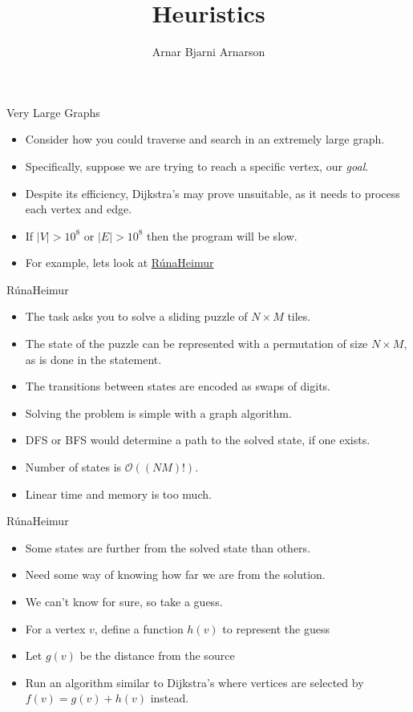 \documentclass{beamer}
\title{Heuristics}
\author{Arnar Bjarni Arnarson}
\institute{\href{http://ru.is/td}{School of Computer Science} \\[2pt] \href{http://ru.is}{ReykjavÃ­k University}}
\begin{document}
\maketitle

\begin{frame}[plain]{Very Large Graphs}
    \vspace{5pt}
    \begin{itemize}
        \item Consider how you could traverse and search in an extremely large graph.
        \item Specifically, suppose we are trying to reach a specific vertex, our \emph{goal}.
        \item Despite its efficiency, Dijkstra's may prove unsuitable, as it needs to process each vertex and edge.
        \item If $|V| > 10^8$ or $|E| > 10^8$ then the program will be slow.
        \item For example, lets look at \href{https://open.kattis.com/problems/runaheimur}{RúnaHeimur}
    \end{itemize}
\end{frame}

\begin{frame}[plain]{RúnaHeimur}
    \begin{itemize}
        \item The task asks you to solve a sliding puzzle of $N \times M$ tiles.
        \item The state of the puzzle can be represented with a permutation of size $N \times M$, as is done in the statement.
        \item The transitions between states are encoded as swaps of digits.
        \item Solving the problem is simple with a graph algorithm.
        \item DFS or BFS would determine a path to the solved state, if one exists.
        \item Number of states is $\mathcal{O}\left((NM)!\right)$.
        \item Linear time and memory is too much.
    \end{itemize}
\end{frame}

\begin{frame}[plain]{RúnaHeimur}
    \begin{itemize}
        \item Some states are further from the solved state than others.
        \item Need some way of knowing how far we are from the solution.
        \item We can't know for sure, so take a guess.
        \item For a vertex $v$, define a function $h(v)$ to represent the guess
        \item Let $g(v)$ be the distance from the source
        \item Run an algorithm similar to Dijkstra's where vertices are selected by $f(v) = g(v) + h(v)$ instead.
    \end{itemize}
\end{frame}
\end{document}
